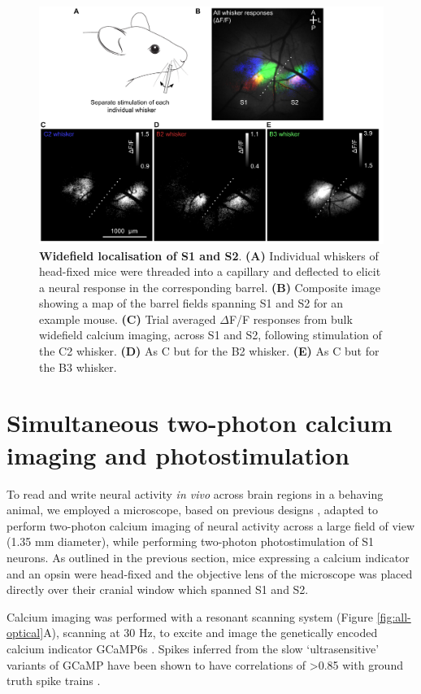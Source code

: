 \begin{figure}[h]
\includegraphics[scale=0.62]{figures/widefield-localisation.pdf}
\caption[\textbf{Widefield localisation of S1 and S2}]{
\textbf{Widefield localisation of S1 and S2}. \textbf{(A)} Individual whiskers of head-fixed mice were threaded into a capillary and deflected to elicit a neural response in the corresponding barrel. \textbf{(B)} Composite image showing a map of the barrel fields spanning S1 and S2 for an example mouse. \textbf{(C)} Trial averaged $\Delta$F/F responses from bulk widefield calcium imaging, across S1 and S2, following stimulation of the C2 whisker. \textbf{(D)} As C but for the B2 whisker. \textbf{(E)} As C but for the B3 whisker.
} 
\label{fig:widefield}
\end{figure}

\section{Simultaneous two-photon calcium imaging and photostimulation}

To read and write neural activity \textit{in vivo} across brain regions in a behaving animal, we employed a microscope, based on previous designs \cite{packer_simultaneous_2015}, adapted to perform two-photon calcium imaging of neural activity across a large field of view (1.35 mm diameter), while performing two-photon photostimulation of S1 neurons. As outlined in the previous section, mice expressing a calcium indicator and an opsin were head-fixed and the objective lens of the microscope was placed directly over their cranial window which spanned S1 and S2. 

Calcium imaging was performed with a resonant scanning system (Figure \ref{fig:all-optical}A), scanning at 30 Hz, to excite and image the genetically encoded calcium indicator GCaMP6s \cite{chen_behaviour-dependent_2013}. Spikes inferred from the slow ‘ultrasensitive’ variants of GCaMP have been shown to have correlations of >0.85 with ground truth spike trains \cite{friedrich_fast_2017}.

